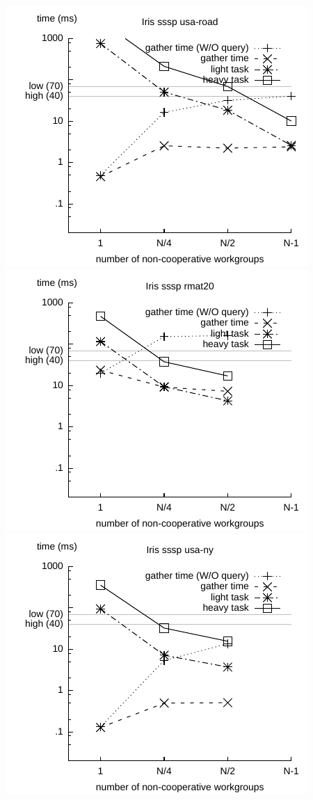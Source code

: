 \documentclass[parskip=half,sigconf,review, anonymous=true, acmcopyrightmode=none]{acmart}
\begin{document}
\includegraphics[width=.7\columnwidth]{images/barrier/iris_sssp_usa_road.pdf} \\
\includegraphics[width=.7\columnwidth]{images/barrier/iris_sssp_rmat20.pdf} \\
\includegraphics[width=.7\columnwidth]{images/barrier/iris_sssp_usa_ny.pdf} \\
\end{document}
